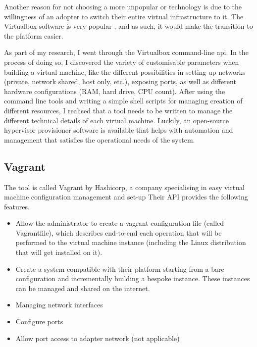 \documentclass{article}
\let\oldcite=\cite
\renewcommand\cite[1]{\ifthenelse{\equal{#1}{_NEEDED_}}{[citation~needed]}{\oldcite{#1}}}
\begin{document}
Another reason for not choosing a more unpopular or technology is due to the willingness of an adopter to switch their entire virtual infrastructure to it. The Virtualbox software is very popular \cite{_NEEDED_}, and as such, it would make the transition to the platform easier.

As part of my research, I went through the Virtualbox command-line \gls{api}. In the process of doing so, I discovered the variety of customisable parameters when building a virtual machine, like the different possibilities in setting up networks (private, network shared, host only, etc.), exposing ports, as well as different hardware configurations (RAM, hard drive, CPU count). After using the command line tools and writing a simple shell scripts for managing creation of different resources, I realised that a tool needs to be written to manage the different technical details of each virtual machine. Luckily, an open-source hypervisor provisioner software is available that helps with automation and management that satisfies the operational needs of the system.

\subsection{Vagrant}
The tool is called Vagrant by Hashicorp, a company specialising in easy virtual machine configuration management and set-up Their API provides the following features.

\begin{itemize}
    \item
          Allow the administrator to create a \gls{vagrant} configuration file (called Vagrantfile), which describes end-to-end each operation that will be performed to the virtual machine instance (including the Linux distribution that will get installed on it).
    \item
          Create a system compatible with their platform starting from a bare configuration and incrementally building a bespoke instance. These instances can be managed and shared on the internet.
    \item
          Managing network interfaces
    \item
          Configure ports
    \item
          Allow port access to adapter network (not applicable)
\end{itemize}
\end{document}

